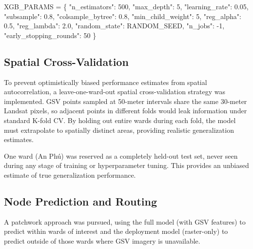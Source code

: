 \documentclass[
]{article}
\newenvironment{Shaded}{\begin{snugshade}}{\end{snugshade}}
\newcommand{\DecValTok}[1]{\textcolor[rgb]{0.68,0.00,0.00}{#1}}
\newcommand{\FloatTok}[1]{\textcolor[rgb]{0.68,0.00,0.00}{#1}}
\newcommand{\NormalTok}[1]{\textcolor[rgb]{0.00,0.23,0.31}{#1}}
\newcommand{\OperatorTok}[1]{\textcolor[rgb]{0.37,0.37,0.37}{#1}}
\newcommand{\StringTok}[1]{\textcolor[rgb]{0.13,0.47,0.30}{#1}}
\begin{document}
\begin{Shaded}
\begin{Highlighting}[]
\NormalTok{XGB\_PARAMS }\OperatorTok{=}\NormalTok{ \{}
    \StringTok{"n\_estimators"}\NormalTok{: }\DecValTok{500}\NormalTok{,}
    \StringTok{"max\_depth"}\NormalTok{: }\DecValTok{5}\NormalTok{,}
    \StringTok{"learning\_rate"}\NormalTok{: }\FloatTok{0.05}\NormalTok{,}
    \StringTok{"subsample"}\NormalTok{: }\FloatTok{0.8}\NormalTok{,}
    \StringTok{"colsample\_bytree"}\NormalTok{: }\FloatTok{0.8}\NormalTok{,}
    \StringTok{"min\_child\_weight"}\NormalTok{: }\DecValTok{5}\NormalTok{,}
    \StringTok{"reg\_alpha"}\NormalTok{: }\FloatTok{0.5}\NormalTok{,}
    \StringTok{"reg\_lambda"}\NormalTok{: }\FloatTok{2.0}\NormalTok{,}
    \StringTok{"random\_state"}\NormalTok{: RANDOM\_SEED,}
    \StringTok{"n\_jobs"}\NormalTok{: }\OperatorTok{{-}}\DecValTok{1}\NormalTok{,}
    \StringTok{"early\_stopping\_rounds"}\NormalTok{: }\DecValTok{50}
\NormalTok{\}}
\end{Highlighting}
\end{Shaded}

\subsection{Spatial Cross-Validation}
\label{subsec:cv}

To prevent optimistically biased performance estimates from spatial autocorrelation, a leave-one-ward-out spatial cross-validation strategy was implemented. GSV points sampled at 50-meter intervals share the same 30-meter Landsat pixels, so adjacent points in different folds would leak information under standard K-fold CV. By holding out entire wards during each fold, the model must extrapolate to spatially distinct areas, providing realistic generalization estimates.

One ward (An Phú) was reserved as a completely held-out test set, never seen during any stage of training or hyperparameter tuning. This provides an unbiased estimate of true generalization performance.

\subsection{Node Prediction and Routing}
\label{subsec:routing-implementation}

A patchwork approach was pursued, using the full model (with GSV features) to predict within wards of interest and the deployment model (raster-only) to predict outside of those wards where GSV imagery is unavailable.
\end{document}
